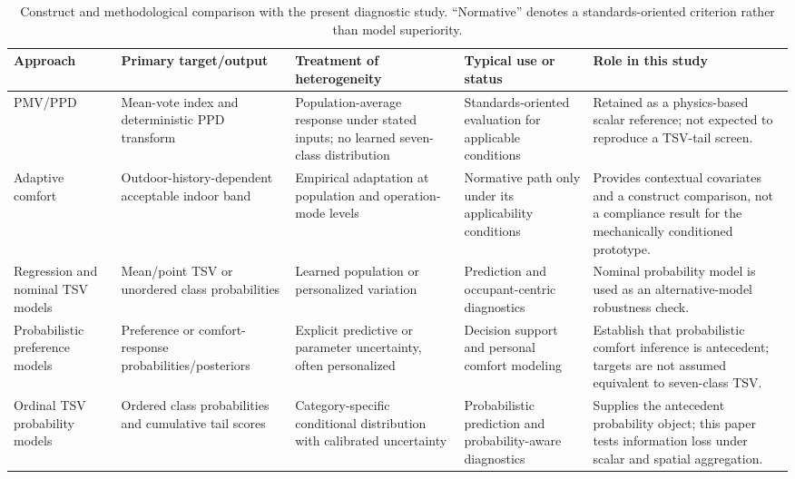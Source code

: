 \begin{table}[htbp]
\centering
\caption{Construct and methodological comparison with the present diagnostic study. ``Normative'' denotes a standards-oriented criterion rather than model superiority.}
\label{tab:construct_literature_comparison}
\footnotesize
\begin{tabularx}{\textwidth}{@{}
>{\raggedright\arraybackslash}p{}
>{\raggedright\arraybackslash}p{}
>{\raggedright\arraybackslash}p{}
>{\raggedright\arraybackslash}p{}
>{\raggedright\arraybackslash}X@{}}
\toprule
\textbf{Approach} & \textbf{Primary target/output} & \textbf{Treatment of heterogeneity} & \textbf{Typical use or status} & \textbf{Role in this study} \\
\midrule
PMV/PPD \citep{Fanger1970PMV,ISO7730_2025,ASHRAE2023}
& Mean-vote index and deterministic PPD transform
& Population-average response under stated inputs; no learned seven-class distribution
& Standards-oriented evaluation for applicable conditions
& Retained as a physics-based scalar reference; not expected to reproduce a TSV-tail screen. \\

Adaptive comfort \citep{deDear1998Adaptive,Brager2000Adaptive}
& Outdoor-history-dependent acceptable indoor band
& Empirical adaptation at population and operation-mode levels
& Normative path only under its applicability conditions
& Provides contextual covariates and a construct comparison, not a compliance result for the mechanically conditioned prototype. \\

Regression and nominal TSV models \citep{Luo2020CompareML,Kim2018PCM}
& Mean/point TSV or unordered class probabilities
& Learned population or personalized variation
& Prediction and occupant-centric diagnostics
& Nominal probability model is used as an alternative-model robustness check. \\

Probabilistic preference models \citep{Kim2019Bayesian,Zhang2024BayesianMeta}
& Preference or comfort-response probabilities/posteriors
& Explicit predictive or parameter uncertainty, often personalized
& Decision support and personal comfort modeling
& Establish that probabilistic comfort inference is antecedent; targets are not assumed equivalent to seven-class TSV. \\

Ordinal TSV probability models \citep{Favero2023Ordinal,guo2026seven}
& Ordered class probabilities and cumulative tail scores
& Category-specific conditional distribution with calibrated uncertainty
& Probabilistic prediction and probability-aware diagnostics
& Supplies the antecedent probability object; this paper tests information loss under scalar and spatial aggregation. \\
\bottomrule
\end{tabularx}
\end{table}

